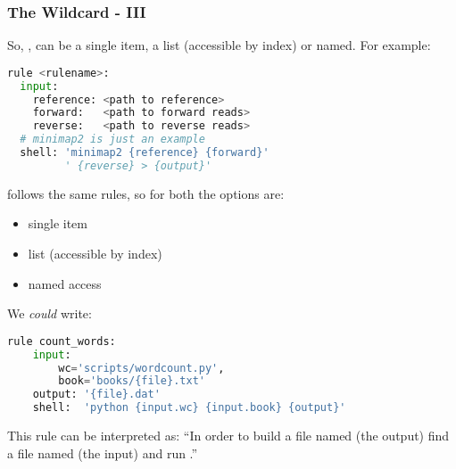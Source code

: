 \begin{frame}[fragile]
  \frametitle{The  Wildcard - III}
  So, , can be a single item, a list (accessible by index) or named. For example:
  \begin{lstlisting}[language=Python,style=Python]
rule <rulename>:
  input:
    reference: <path to reference>
    forward:   <path to forward reads>
    reverse:   <path to reverse reads>
  # minimap2 is just an example
  shell: 'minimap2 {reference} {forward}' 
         ' {reverse} > {output}'
  \end{lstlisting}
  \pause
   follows the same rules, so for both the options are:
  \begin{itemize}
   \item single item
   \item list (accessible by index)
   \item named access
  \end{itemize}
\end{frame}

\begin{frame}[fragile]
  We \emph{could} write:
  \begin{lstlisting}[language=Python,style=Python]
rule count_words:
    input:
        wc='scripts/wordcount.py',
        book='books/{file}.txt'
    output: '{file}.dat'
    shell:  'python {input.wc} {input.book} {output}'
  \end{lstlisting}
  \begin{block}{This rule can be interpreted as:}
``In order to build a file named  (the output) find a file named  (the input) and run .''
  \end{block}
\end{frame}
